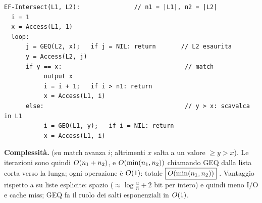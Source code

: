 \begin{verbatim}
EF-Intersect(L1, L2):               // n1 = |L1|, n2 = |L2|
  i = 1
  x = Access(L1, 1)
  loop:
      j = GEQ(L2, x);   if j = NIL: return       // L2 esaurita
      y = Access(L2, j)
      if y == x:                                  // match
           output x
           i = i + 1;   if i > n1: return
           x = Access(L1, i)
      else:                                       // y > x: scavalca in L1
           i = GEQ(L1, y);   if i = NIL: return
           x = Access(L1, i)
\end{verbatim}

\textbf{Complessit\`a.}  (su
match avanza $i$; altrimenti $x$ salta a un valore $\ge y>x$). Le iterazioni sono quindi
$O\!\left(n_1+n_2\right)$, e $O\!\left(\min(n_1,n_2)\right)$ chiamando GEQ dalla lista corta verso la lunga; ogni
operazione \`e $O\!\left(1\right)$: totale $\boxed{O\!\left(\min(n_1,n_2)\right)}$ .
Vantaggio rispetto a  su liste esplicite: spazio ($\approx\log\frac{u}{n}+2$ bit per
intero) e quindi meno I/O e cache miss; GEQ fa il ruolo dei salti esponenziali in $O\!\left(1\right)$.
